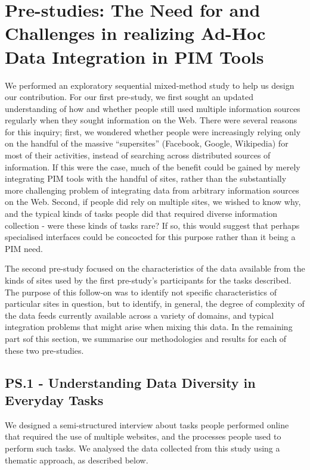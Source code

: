 \documentclass{sigchi}
\begin{document}
\section{Pre-studies: The Need for and Challenges in realizing Ad-Hoc Data Integration in PIM Tools}


We performed an exploratory sequential mixed-method study to help us design our contribution. For our first pre-study, we first sought an updated understanding of how and whether people still used multiple information sources regularly when they sought information on the Web. There were several reasons for this inquiry; first, we wondered whether people were increasingly relying only on the handful of the massive ``supersites'' (Facebook, Google, Wikipedia) for most of their activities, instead of  searching across distributed sources of information.  If this were the case, much of the benefit could be gained by merely integrating PIM tools with the handful of sites, rather than the substantially more challenging problem of integrating data from arbitrary information sources on the Web.   Second, if people did rely on multiple sites, we wished to know why, and the typical kinds of tasks people did that required diverse information collection - were these kinds of tasks rare?  If so, this would suggest that perhaps specialised interfaces could be concocted for this purpose rather than it being a PIM need. 

The second pre-study focused on the characteristics of the data available from the kinds of sites used by the first pre-study's participants for the tasks described. The purpose of this follow-on  was to identify not specific characteristics of particular sites in question, but to identify, in general, the degree of complexity of the data feeds currently available across a variety of domains, and typical integration problems that might arise when mixing this data. In the remaining part sof this section, we summarise our methodologies and results for each of these two pre-studies.


\subsection{PS.1 - Understanding Data Diversity in Everyday Tasks}
We designed a semi-structured interview about tasks people performed online that required the use of multiple websites, and the processes people used to perform such tasks.  We analysed the data collected from this study using a thematic approach, as described below. 
\end{document}
